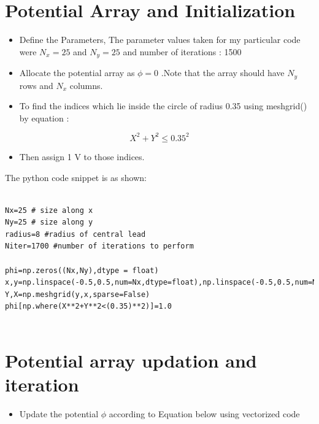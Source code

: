 \documentclass[11pt, a4paper]{article}
\begin{document}
  \section{Potential Array and Initialization}
  

\begin{itemize}
\item
  Define the Parameters, The parameter values taken for my particular code 		  were \(N_x = 25\) and \(N_y = 25\) and number of iterations : 1500
\item
  Allocate the potential array as \(\phi = 0\) .Note that the array
  should have \(N_y\) rows and \(N_x\) columns.
\item
  To find the indices which lie inside the circle of radius 0.35 using
  meshgrid() by equation :
\end{itemize}

\begin{equation}
X ^2 +Y ^2 \leq	 0.35^2
\end{equation}

\begin{itemize}
\item
  Then assign 1 V to those indices.

\end{itemize}

The python code snippet is as shown:
\begin{verbatim}

Nx=25 # size along x
Ny=25 # size along y
radius=8 #radius of central lead
Niter=1700 #number of iterations to perform
   
phi=np.zeros((Nx,Ny),dtype = float)
x,y=np.linspace(-0.5,0.5,num=Nx,dtype=float),np.linspace(-0.5,0.5,num=Ny,dtype=float)
Y,X=np.meshgrid(y,x,sparse=False)
phi[np.where(X**2+Y**2<(0.35)**2)]=1.0
  
       \end{verbatim}
       
 	\newpage
 \section{Potential array updation and iteration}

   \begin{itemize}
   
   \item
    Update the potential \(\phi\) according to Equation below using
     vectorized code
   \end{itemize}
   
\end{document}
